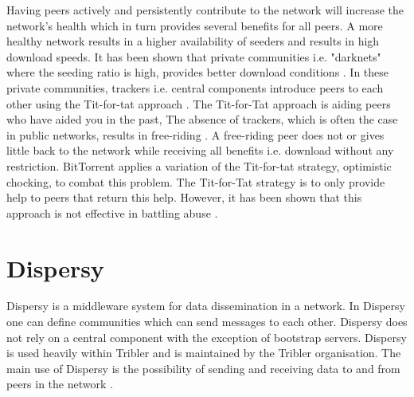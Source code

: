 Having peers actively and persistently contribute to the network will increase the network's health which in turn provides several benefits for all peers.
A more healthy network results in a higher availability of seeders and results in high download speeds.
It has been shown that private communities i.e. "darknets" where the seeding ratio is high, provides better download conditions \cite{meulpolder-privatecommunities}.
In these private communities, trackers i.e. central components introduce peers to each other using the Tit-for-tat approach \cite{cohen-titfortat}.
The Tit-for-Tat approach is aiding peers who have aided you in the past,
The absence of trackers, which is often the case in public networks, results in free-riding \cite{Adar-Freeriding}.
A free-riding peer does not or gives little back to the network while receiving all benefits i.e. download without any restriction.
BitTorrent applies a variation of the Tit-for-tat strategy, optimistic chocking, to combat this problem.
The Tit-for-Tat strategy is to only provide help to peers that return this help.
However, it has been shown that this approach is not effective in battling abuse \cite{Pouwelse-tribler}.
\fi

\section{Dispersy}
Dispersy is a middleware system for data dissemination in a network.
In Dispersy one can define communities which can send messages to each other.
Dispersy does not rely on a central component with the exception of bootstrap servers.
Dispersy is used heavily within Tribler and is maintained by the Tribler organisation.
The main use of Dispersy is the possibility of sending and receiving data to and from peers in the network \cite{zeilemaker-dispersy}.